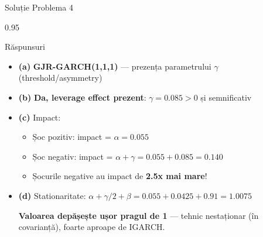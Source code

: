 \documentclass[9pt, aspectratio=169, t]{beamer}
\begin{document}
\begin{frame}{Soluție Problema 4}
    \begin{cminipage}{0.95\textwidth}
    \begin{exampleblock}{Răspunsuri}
        \begin{itemize}\setlength{\itemsep}{0pt}
            \item \textbf{(a)} \textbf{GJR-GARCH(1,1,1)} --- prezența parametrului $\gamma$ (threshold/asymmetry)

            \vspace{0.2cm}

            \item \textbf{(b)} \textbf{Da, leverage effect prezent}: $\gamma = 0.085 > 0$ și semnificativ

            \vspace{0.2cm}

            \item \textbf{(c)} Impact:
            \begin{itemize}\setlength{\itemsep}{0pt}
                \item Șoc pozitiv: impact = $\alpha = 0.055$
                \item Șoc negativ: impact = $\alpha + \gamma = 0.055 + 0.085 = 0.140$
                \item Șocurile negative au impact de \textbf{2.5x mai mare}!
            \end{itemize}

            \vspace{0.2cm}

            \item \textbf{(d)} Stationaritate: $\alpha + \gamma/2 + \beta = 0.055 + 0.0425 + 0.91 = 1.0075$

            \textbf{Valoarea depășește ușor pragul de 1} --- tehnic nestaționar (în covarianță), foarte aproape de IGARCH.
        \end{itemize}
    \end{exampleblock}
    \end{cminipage}
\end{frame}
\end{document}
